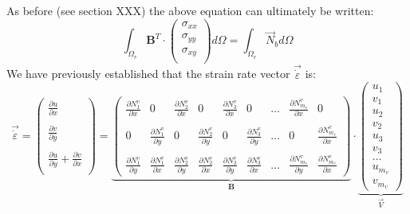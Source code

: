 As before (see section XXX) the above equation can ultimately be written:
\begin{equation}
\int_{\Omega_e} {\bm B}^T \cdot 
\left(
\begin{array}{c}
\sigma_{xx}\\
\sigma_{yy}\\
\sigma_{xy}\\
\end{array}
\right)
d\Omega
=
\int_{\Omega_e} {\vec N}_b d\Omega 
\end{equation}
We have previously established that the strain rate 
vector $\vec{\dot \varepsilon}$ is:
\begin{equation}
\vec{\dot\varepsilon}=
\left(
\begin{array}{c}
\frac{\partial u}{\partial x} \\ \\
\frac{\partial v}{\partial y} \\ \\
\frac{\partial u}{\partial y} + \frac{\partial v}{\partial x} \\
\end{array}
\right)
=
\underbrace{
\left(
\begin{array}{ccccccccccc}
\frac{\partial N_1^v}{\partial x} & 0 & 
\frac{\partial N_2^v}{\partial x} & 0 & 
\frac{\partial N_3^v}{\partial x} & 0 & \dots & 
\frac{\partial N_{m_v}^v}{\partial x} & 0
\\  \\
0 & \frac{\partial N_1^v}{\partial y} & 
0 & \frac{\partial N_2^v}{\partial y} &
0 & \frac{\partial N_3^v}{\partial y} & \dots & 
0 & \frac{\partial N_{m_v}^v}{\partial x} 
\\ \\
\frac{\partial N_1^v}{\partial y} &  \frac{\partial N_1^v}{\partial x} &  
\frac{\partial N_2^v}{\partial y} &  \frac{\partial N_2^v}{\partial x} & 
\frac{\partial N_3^v}{\partial y} &  \frac{\partial N_3^v}{\partial x} &   \dots &  
\frac{\partial N_{m_v}^v}{\partial y} &  \frac{\partial N_{m_v}^v}{\partial x}  
\end{array}
\right) 
}_{\bm B}
\cdot
\underbrace{
\left(
\begin{array}{c}
u_1 \\ v_1 \\ u_2 \\ v_2 \\ u_3 \\ v_3 \\ \dots \\ u_{m_v} \\ v_{m_v}
\end{array}
\right)
}_{\vec V}
\end{equation}

